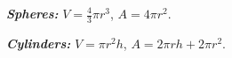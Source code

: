 \documentclass[10pt,landscape,letterpaper]{article}
\newcommand{\fsheetlabel}[1]{\textcolor{FSheetLabelColor}{\textbf{\textit{#1}}}}
\begin{document}
\begin{multicols*}{3}
\begin{minipage}{\columnwidth}
        \fsheetlabel{Spheres:} $ V = \frac{4}{3} \pi r^3 $, $ A = 4\pi r^2 $.
        
        \fsheetlabel{Cylinders:} $ V = \pi r^2 h $, $ A = 2\pi r h + 2\pi r^2 $.
    \end{minipage}
    \vspace{2ex plus .5ex minus .5ex}
    
    \end{multicols*}
\end{document}
